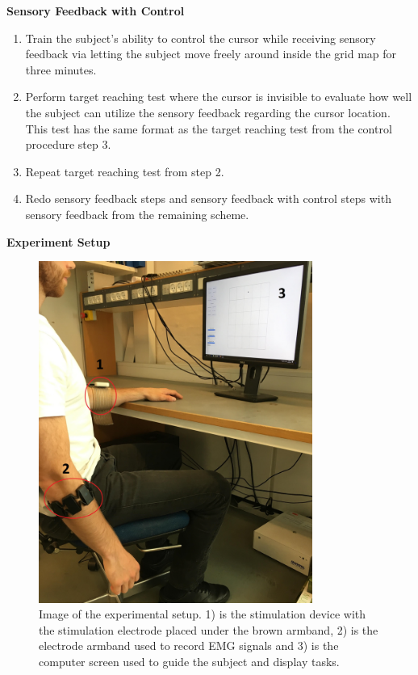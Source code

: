 \textbf{Sensory Feedback with Control} \\
\vspace{-25pt}
\begin{enumerate}
	\item Train the subject's ability to control the cursor while receiving sensory feedback via letting the subject move freely around inside the grid map for three minutes.
	\item Perform target reaching test where the cursor is invisible to evaluate how well the subject can utilize the sensory feedback regarding the cursor location. This test has the same format as the target reaching test from the control procedure step 3.
	\item Repeat target reaching test from step 2.
	\item Redo sensory feedback steps and sensory feedback with control steps with sensory feedback from the remaining scheme.
\end{enumerate}


\newpage
\textbf{{\Large Experiment Setup}} \\

\begin{figure}[H]                 
	\includegraphics[width=0.8\textwidth]{figures/setupimg}  
	\caption{Image of the experimental setup. 1) is the stimulation device with the stimulation electrode placed under the brown armband, 2) is the electrode armband used to record EMG signals and 3) is the computer screen used to guide the subject and display tasks.} 
	\label{fig:setup} 
\end{figure}

